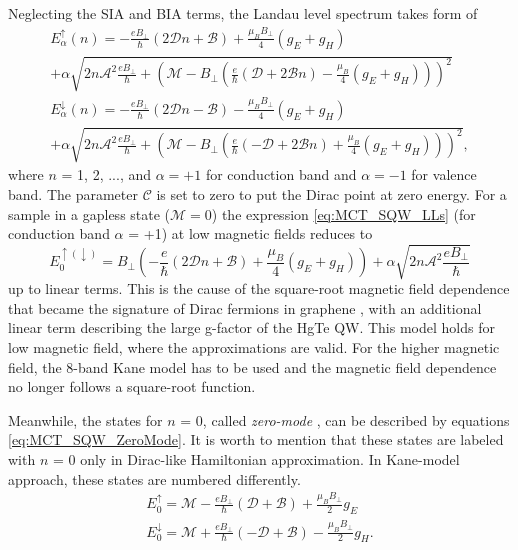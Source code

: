 \documentclass[titlepage,a4paper]{book}
\begin{document}
Neglecting the SIA and BIA terms, the Landau level spectrum takes form of
\begin{equation}
\label{eq:MCT_SQW_LLs}
\begin{aligned}
E^{\uparrow}_{\alpha}(n) = -\frac{eB_{\perp}}{\hbar}(2\mathcal{D}n+\mathcal{B})+\frac{\mu_B B_{\perp}}{4}(g_E + g_H) \\
+ \alpha\sqrt{2n\mathcal{A}^2\frac{eB_{\perp}}{\hbar} + \left(\mathcal{M}-B_{\perp} \left(\frac{e}{\hbar}(\mathcal{D}+2\mathcal{B}n)-\frac{\mu_B}{4}(g_E + g_H)\right)\right)^2} \\
E^{\downarrow}_{\alpha}(n) = -\frac{eB_{\perp}}{\hbar}(2\mathcal{D}n-\mathcal{B})-\frac{\mu_B B_{\perp}}{4}(g_E + g_H) \\
+ \alpha\sqrt{2n\mathcal{A}^2\frac{eB_{\perp}}{\hbar} + \left(\mathcal{M}-B_{\perp} \left(\frac{e}{\hbar}(-\mathcal{D}+2\mathcal{B}n)+\frac{\mu_B}{4}(g_E + g_H)\right)\right)^2}, 
\end{aligned}
\end{equation}
where $n$ = 1, 2, ..., and $\alpha = +1$ for conduction band and $\alpha = -1$ for valence band. The parameter $\mathcal{C}$ is set to zero to put the Dirac point at zero energy. For a sample in a gapless state ($\mathcal{M} = 0$) the expression \ref{eq:MCT_SQW_LLs} (for conduction band $\alpha$ = +1) at low magnetic fields reduces to
\begin{equation}
\label{eq:MCT_SQW_LLs2}
E^{\uparrow (\downarrow)}_0 = B_{\perp}\left( -\frac{e}{\hbar}(2\mathcal{D}n+\mathcal{B})+\frac{\mu_B}{4}(g_E + g_H)\right)+\alpha\sqrt{2n\mathcal{A}^2\frac{eB_{\perp}}{\hbar}}
\end{equation}
up to linear terms. This is the cause of the square-root magnetic field dependence that became the signature of Dirac fermions in graphene \cite{Castro_graphene}, with an additional linear term describing the large g-factor of the HgTe QW. This model holds for low magnetic field, where the approximations are valid. For the higher magnetic field, the 8-band Kane model has to be used and the magnetic field dependence no longer follows a square-root function.

Meanwhile, the states for $n$ = 0, called \textit{zero-mode} \cite{Bernevig_Topology2}, can be described by equations \ref{eq:MCT_SQW_ZeroMode}. It is worth to mention that these states are labeled with $n$ = 0 only in Dirac-like Hamiltonian approximation. In Kane-model approach, these states are numbered differently. 
\begin{equation}
\label{eq:MCT_SQW_ZeroMode}
\begin{aligned}
E^{\uparrow}_0 = \mathcal{M} -\frac{eB_{\perp}}{\hbar}(\mathcal{D}+\mathcal{B})+\frac{\mu_B B_{\perp}}{2}g_E \\
E^{\downarrow}_0 = \mathcal{M} +\frac{eB_{\perp}}{\hbar}(-\mathcal{D}+\mathcal{B})-\frac{\mu_B B_{\perp}}{2}g_H.
\end{aligned}
\end{equation}
\end{document}
